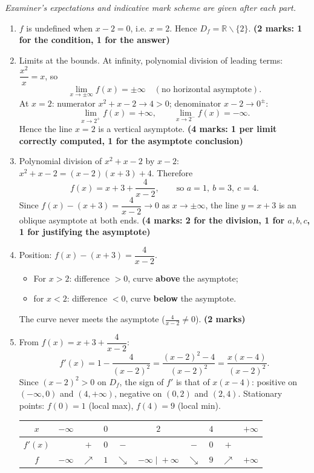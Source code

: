 \documentclass[11pt]{article}
\newcommand{\cle}[1]{{\popxbold\color{popdark}#1}}
\def\setminus{\mathbin{\backslash}}\let\smallsetminus\setminus
\begin{document}
\begin{corrige}
\emph{Examiner's expectations and indicative mark scheme are given after each part.}
\begin{enumerate}
\item $f$ is undefined when $x-2=0$, i.e. $x=2$. Hence $D_f=\mathbb{R}\setminus\{2\}$. \hfill \textbf{(2 marks: 1 for the condition, 1 for the answer)}
\item Limits at the bounds. At infinity, polynomial division of leading terms: $\dfrac{x^{2}}{x}=x$, so
\[ \lim_{x\to\pm\infty}f(x)=\pm\infty \quad(\text{no horizontal asymptote}). \]
At $x=2$: numerator $x^{2}+x-2\to 4>0$; denominator $x-2\to 0^{\pm}$:
\[ \lim_{x\to 2^{+}}f(x)=+\infty,\qquad \lim_{x\to 2^{-}}f(x)=-\infty. \]
Hence the line $x=2$ is a \cle{vertical asymptote}. \hfill \textbf{(4 marks: 1 per limit correctly computed, 1 for the asymptote conclusion)}
\item Polynomial division of $x^{2}+x-2$ by $x-2$: $x^{2}+x-2=(x-2)(x+3)+4$. Therefore
\[ f(x)=x+3+\frac{4}{x-2},\qquad\text{so } a=1,\ b=3,\ c=4. \]
Since $f(x)-(x+3)=\dfrac{4}{x-2}\to 0$ as $x\to\pm\infty$, the line $y=x+3$ is an \cle{oblique asymptote} at both ends. \hfill \textbf{(4 marks: 2 for the division, 1 for $a,b,c$, 1 for justifying the asymptote)}
\item Position: $f(x)-(x+3)=\dfrac{4}{x-2}$.
\begin{itemize}
\item For $x>2$: difference $>0$, curve \textbf{above} the asymptote;
\item for $x<2$: difference $<0$, curve \textbf{below} the asymptote.
\end{itemize}
The curve never meets the asymptote ($\frac{4}{x-2}\neq 0$). \hfill \textbf{(2 marks)}
\item From $f(x)=x+3+\dfrac{4}{x-2}$:
\[ f'(x)=1-\frac{4}{(x-2)^{2}}=\frac{(x-2)^{2}-4}{(x-2)^{2}}=\frac{x(x-4)}{(x-2)^{2}}. \]
Since $(x-2)^{2}>0$ on $D_f$, the sign of $f'$ is that of $x(x-4)$: positive on $(-\infty,0)$ and $(4,+\infty)$, negative on $(0,2)$ and $(2,4)$. Stationary points: $f(0)=1$ (local max), $f(4)=9$ (local min).
\begin{center}
\begin{tabular}{|c|ccccccccc|}
\hline
$x$ & $-\infty$ & & $0$ & & $2$ & & $4$ & & $+\infty$ \\
\hline
$f'(x)$ & & $+$ & $0$ & $-$ & & $-$ & $0$ & $+$ & \\
\hline
$f$ & $-\infty$ & $\nearrow$ & $1$ & $\searrow$ & $-\infty\;\big|\;+\infty$ & $\searrow$ & $9$ & $\nearrow$ & $+\infty$ \\

\end{tabular}
\end{center}
\end{enumerate}
\end{corrige}
\end{document}
